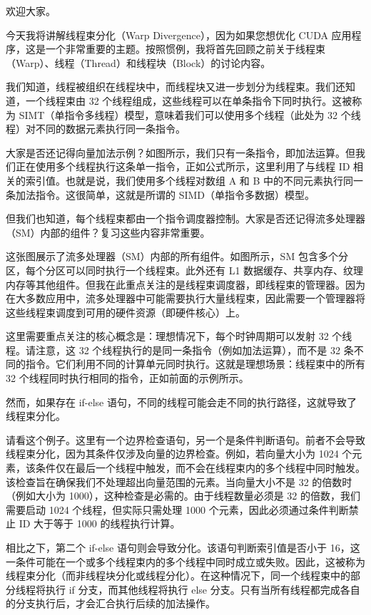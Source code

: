 欢迎大家。

今天我将讲解线程束分化（Warp Divergence），因为如果您想优化 CUDA 应用程序，这是一个非常重要的主题。按照惯例，我将首先回顾之前关于线程束（Warp）、线程（Thread）和线程块（Block）的讨论内容。

我们知道，线程被组织在线程块中，而线程块又进一步划分为线程束。我们还知道，一个线程束由 32 个线程组成，这些线程可以在单条指令下同时执行。这被称为 SIMT（单指令多线程）模型，意味着我们可以使用多个线程（此处为 32 个线程）对不同的数据元素执行同一条指令。

大家是否还记得向量加法示例？如图所示，我们只有一条指令，即加法运算。但我们正在使用多个线程执行这条单一指令，正如公式所示，这里利用了与线程 ID 相关的索引值。也就是说，我们使用多个线程对数组 A 和 B 中的不同元素执行同一条加法指令。这很简单，这就是所谓的 SIMD（单指令多数据）模型。

但我们也知道，每个线程束都由一个指令调度器控制。大家是否还记得流多处理器（SM）内部的组件？复习这些内容非常重要。

这张图展示了流多处理器（SM）内部的所有组件。如图所示，SM 包含多个分区，每个分区可以同时执行一个线程束。此外还有 L1 数据缓存、共享内存、纹理内存等其他组件。但我在此重点关注的是线程束调度器，即线程束的管理器。因为在大多数应用中，流多处理器中可能需要执行大量线程束，因此需要一个管理器将这些线程束调度到可用的硬件资源（即硬件核心）上。

这里需要重点关注的核心概念是：理想情况下，每个时钟周期可以发射 32 个线程。请注意，这 32 个线程执行的是同一条指令（例如加法运算），而不是 32 条不同的指令。它们利用不同的计算单元同时执行。这就是理想场景：线程束中的所有 32 个线程同时执行相同的指令，正如前面的示例所示。

然而，如果存在 if-else 语句，不同的线程可能会走不同的执行路径，这就导致了线程束分化。

请看这个例子。这里有一个边界检查语句，另一个是条件判断语句。前者不会导致线程束分化，因为其条件仅涉及向量的边界检查。例如，若向量大小为 1024 个元素，该条件仅在最后一个线程中触发，而不会在线程束内的多个线程中同时触发。该检查旨在确保我们不处理超出向量范围的元素。当向量大小不是 32 的倍数时（例如大小为 1000），这种检查是必需的。由于线程数量必须是 32 的倍数，我们需要启动 1024 个线程，但实际只需处理 1000 个元素，因此必须通过条件判断禁止 ID 大于等于 1000 的线程执行计算。

相比之下，第二个 if-else 语句则会导致分化。该语句判断索引值是否小于 16，这一条件可能在一个或多个线程束内的多个线程中同时成立或失败。因此，这被称为线程束分化（而非线程块分化或线程分化）。在这种情况下，同一个线程束中的部分线程将执行 if 分支，而其他线程将执行 else 分支。只有当所有线程都完成各自的分支执行后，才会汇合执行后续的加法操作。

